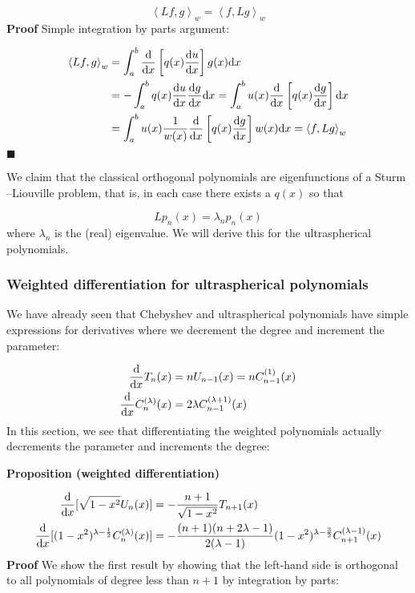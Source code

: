 \documentclass[12pt,a4paper]{article}
\def\half{ {1 \over 2} }
\def\D{ {\rm d} }
\def\addtab#1={#1\;&=}
\def\ccr{\\\addtab}
\def\ip<#1>{\left\langle{#1}\right\rangle}
\def\dx{\D x}
\def\endash{–}
\def\addtab#1={#1\;&=}
\def\ccr{\\\addtab}
\begin{document}
\[
\ip<L f,g>_w = \ip<f, Lg>_w
\]
\textbf{Proof} Simple integration by parts argument:


\begin{align*}
\ip<L f,g>_w &= \int_a^b {\D \over \dx}\left[ q(x) {\D u\over \dx}\right]  g(x)\dx \ccr
=  -\int_a^b q(x) {\D u\over \dx}    {\D g\over \dx} \dx =  \int_a^b   u(x)  {\D \over \dx} \left[ q(x) {\D g\over \dx}\right] \dx \ccr
=
 \int_a^b   u(x)  {1 \over w(x)} {\D \over \dx}\left[q(x) {\D g\over \dx}\right] w(x) \dx = \ip<f, Lg>_w
 \end{align*}
\ensuremath{\blacksquare}

We claim that the classical orthogonal polynomials are eigenfunctions of a Sturm\ensuremath{\endash}Liouville problem, that is, in each case there exists a $q(x)$ so that

\[
L p_n(x) = \lambda_n p_n(x)
\]
where $\lambda_n$ is the (real) eigenvalue. We will derive this for the ultraspherical polynomials.

\subsubsection{Weighted differentiation for ultraspherical polynomials}
We have already seen that Chebyshev and ultraspherical polynomials have simple expressions for derivatives where we decrement the degree and increment the parameter:


\begin{align*}
{\D \over \dx } T_n(x) & = n U_{n-1}(x) = n C_{n-1}^{(1)}(x) \\
{\D \over \dx } C_n^{(\lambda)}(x) &= 2 \lambda C_{n-1}^{(\lambda+1)}(x)
\end{align*}
In this section, we see that differentiating the weighted polynomials actually decrements the parameter and increments the degree:

\textbf{Proposition (weighted differentiation)}


\begin{align*}
{\D \over \dx }[\sqrt{1-x^2} U_n(x)] &= - {n+1 \over \sqrt{1-x^2}} T_{n+1}(x) \\
{\D \over \dx }[(1-x^2)^{\lambda-\half} C_n^{(\lambda)}(x)] & = -{(n+1) (n+2 \lambda-1) \over 2 (\lambda-1) }  (1-x^2)^{\lambda - {3 \over 2}} C_{n+1}^{(\lambda-1)}(x)
\end{align*}
\textbf{Proof} We show the first result by showing that the left-hand side is orthogonal to all  polynomials of degree less than $n+1$ by integration by parts:
\end{document}
